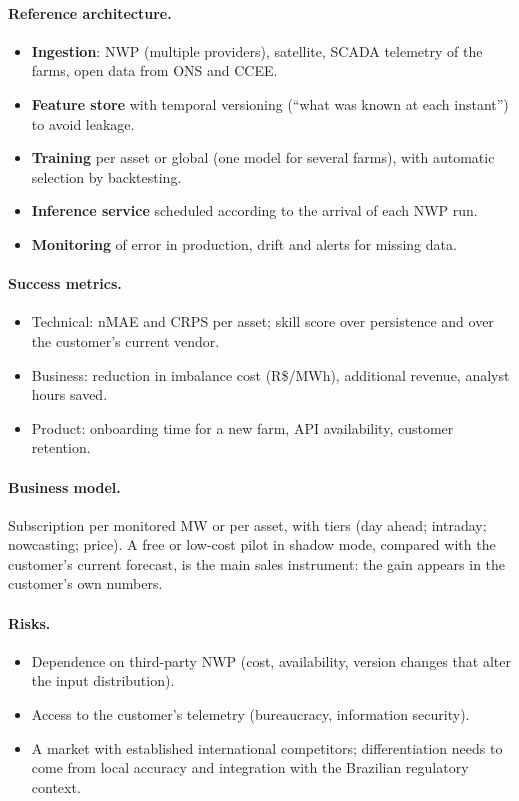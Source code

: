 \documentclass[10pt,a4paper,oneside]{article}
\begin{document}
\paragraph{Reference architecture.}
\begin{itemize}
  \item \textbf{Ingestion}: NWP (multiple providers), satellite, SCADA
    telemetry of the farms, open data from ONS and CCEE.
  \item \textbf{Feature store} with temporal versioning (``what was known at
    each instant'') to avoid leakage.
  \item \textbf{Training} per asset or global (one model for several farms),
    with automatic selection by backtesting.
  \item \textbf{Inference service} scheduled according to the arrival of
    each NWP run.
  \item \textbf{Monitoring} of error in production, drift and alerts for
    missing data.
\end{itemize}

\paragraph{Success metrics.}
\begin{itemize}
  \item Technical: nMAE and CRPS per asset; skill score over persistence and
    over the customer's current vendor.
  \item Business: reduction in imbalance cost (R\$/MWh), additional revenue,
    analyst hours saved.
  \item Product: onboarding time for a new farm, API availability, customer
    retention.
\end{itemize}

\paragraph{Business model.}
Subscription per monitored MW or per asset, with tiers (day ahead; intraday;
nowcasting; price). A free or low-cost pilot in shadow mode, compared with
the customer's current forecast, is the main sales instrument: the gain
appears in the customer's own numbers.

\paragraph{Risks.}
\begin{itemize}
  \item Dependence on third-party NWP (cost, availability, version changes
    that alter the input distribution).
  \item Access to the customer's telemetry (bureaucracy, information
    security).
  \item A market with established international competitors; differentiation
    needs to come from local accuracy and integration with the Brazilian
    regulatory context.
\end{itemize}
\end{document}
